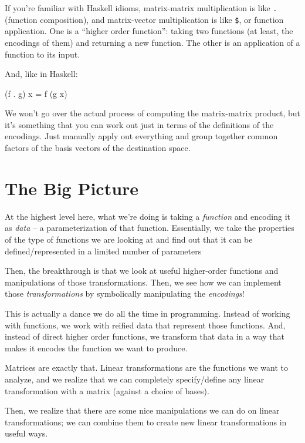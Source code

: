 \documentclass[]{article}
\newenvironment{Shaded}{}{}
\newcommand{\NormalTok}[1]{#1}
\newcommand{\OperatorTok}[1]{\textcolor[rgb]{0.40,0.40,0.40}{#1}}
\newcommand{\OtherTok}[1]{\textcolor[rgb]{0.00,0.44,0.13}{#1}}
\begin{document}
If you're familiar with Haskell idioms, matrix-matrix multiplication is like
\texttt{.} (function composition), and matrix-vector multiplication is like
\texttt{\$}, or function application. One is a ``higher order function'': taking
two functions (at least, the encodings of them) and returning a new function.
The other is an application of a function to its input.

And, like in Haskell:

\begin{Shaded}
\begin{Highlighting}[]
\NormalTok{(f }\OperatorTok{.}\NormalTok{ g) x }\OtherTok{=}\NormalTok{ f (g x)}
\end{Highlighting}
\end{Shaded}

We won't go over the actual process of computing the matrix-matrix product, but
it's something that you can work out just in terms of the definitions of the
encodings. Just manually apply out everything and group together common factors
of the basis vectors of the destination space.

\section{The Big Picture}\label{the-big-picture}

At the highest level here, what we're doing is taking a \emph{function} and
encoding it as \emph{data} -- a parameterization of that function. Essentially,
we take the properties of the type of functions we are looking at and find out
that it can be defined/represented in a limited number of parameters

Then, the breakthrough is that we look at useful higher-order functions and
manipulations of those transformations. Then, we see how we can implement those
\emph{transformations} by symbolically manipulating the \emph{encodings}!

This is actually a dance we do all the time in programming. Instead of working
with functions, we work with reified data that represent those functions. And,
instead of direct higher order functions, we transform that data in a way that
makes it encodes the function we want to produce.

Matrices are exactly that. Linear transformations are the functions we want to
analyze, and we realize that we can completely specify/define any linear
transformation with a matrix (against a choice of bases).

Then, we realize that there are some nice manipulations we can do on linear
transformations; we can combine them to create new linear transformations in
useful ways.
\end{document}
